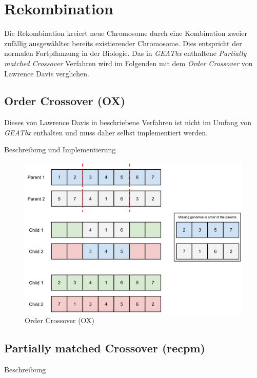 \section{Rekombination}\label{recombination}

Die Rekombination kreiert neue Chromosome durch eine Kombination zweier zufällig
ausgewählter bereits existierender Chromosome. Dies entspricht der normalen
Fortpflanzung in der Biologie.
Das in \emph{GEATbx} enthaltene \emph{Partially matched Crossover} Verfahren
wird im Folgenden mit dem \emph{Order Crossover} von Lawrence Davis verglichen.


\subsection{Order Crossover (OX)}
Dieses von Lawrence Davis in \citep{ox} beschriebene Verfahren ist nicht im
Umfang von \emph{GEATbx} enthalten und muss daher selbst implementiert werden.

Beschreibung und Implementierung %

\begin{figure}[h!]
  \centering
  \includegraphics[width=1.0\textwidth]{Figures/recox.pdf}
  \caption{Order Crossover (OX)}\label{fig.recox}
\end{figure}


\subsection{Partially matched Crossover (recpm)}
Beschreibung \citep{erben} %


